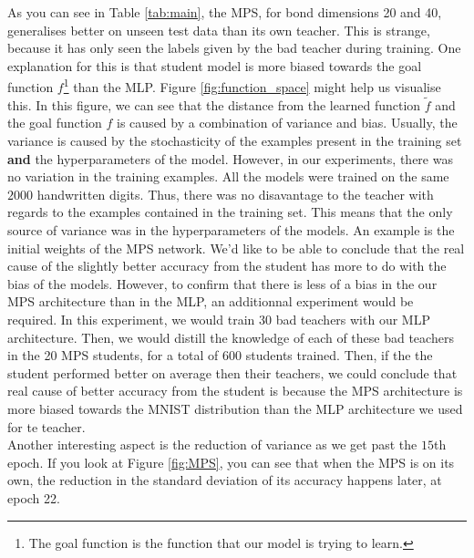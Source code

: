 \documentclass{article}
\theoremstyle{definition}
\theoremstyle{definition}
\begin{document}
As you can see in Table \ref{tab:main}, the MPS, for bond dimensions 20 and 40,  generalises better on unseen test data than its own teacher. This is strange, because it has only seen the labels given by the bad teacher during training. One explanation for this is that student model is more biased towards the goal function $f$\footnote{The goal function is the function that our model is trying to learn.} than the MLP. Figure \ref{fig:function_space} might help us visualise this. In this figure, we can see that the distance from the learned function $\tilde{f}$ and the goal function $f$ is caused by a combination of variance and bias. Usually, the variance is caused by the stochasticity of the examples present in the training set {\bf and} the hyperparameters of the model. However, in our experiments, there was no variation in the training examples. All the models were trained on the same $2000$ handwritten digits. Thus, there was no disavantage to the teacher with regards to the examples contained in the training set. This means that the only source of variance was in the hyperparameters of the models. An example is the initial weights of the MPS network. We'd like to be able to conclude that the real cause of the slightly better accuracy from the student has more to do with the bias of the models. However, to confirm that there is less of a bias in the our MPS architecture than in the MLP, an additionnal experiment would be required. In this experiment, we would train $30$ bad teachers with our MLP architecture. Then, we would distill the knowledge of each of these bad teachers in the 20 MPS students, for a total of $600$ students trained. Then, if the the student performed better on average then their teachers, we could conclude that real cause of better accuracy from the student is because the MPS architecture is more biased towards the MNIST distribution than the MLP architecture we used for te teacher. \\ Another interesting aspect is the reduction of variance as we get past the $15$th epoch. If you look at Figure \ref{fig:MPS}, you can see that when the MPS is on its own, the reduction in the standard deviation of its accuracy happens later, at epoch 22.
\end{document}
